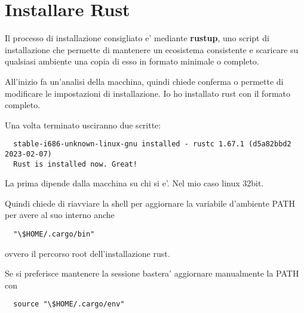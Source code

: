 \chapter{Installare Rust}

Il processo di installazione consigliato e' mediante \textbf{rustup}, uno script di installazione che permette di mantenere un ecosistema consistente e scaricare su qualsiasi ambiente una copia di esso in formato minimale o completo.

All'inizio fa un'analisi della macchina, quindi chiede conferma o permette di modificare le impostazioni di installazione. 
Io ho installato rust con il formato completo.

Una volta terminato usciranno due scritte:

\begin{verbatim}
  stable-i686-unknown-linux-gnu installed - rustc 1.67.1 (d5a82bbd2 2023-02-07)
  Rust is installed now. Great!
\end{verbatim}

La prima dipende dalla macchina su chi si e'. Nel mio caso linux 32bit.

Quindi chiede di riavviare la shell per aggiornare la variabile d'ambiente PATH per avere al suo interno anche
\begin{verbatim}
  "\$HOME/.cargo/bin"
\end{verbatim}
ovvero il percorso root dell'installazione rust.

Se si preferisce mantenere la sessione bastera' aggiornare manualmente la PATH con
\begin{lstlisting}
  source "\$HOME/.cargo/env"
\end{lstlisting}
